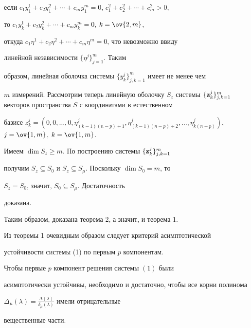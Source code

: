 если $c_1y^1_1+c_2y^2_1+\dotsb+c_m y^m_1=0$, $c^2_1+c^2_2+\dotsb+ c^2_m>0$, 


то $c_1y^1_k+c_2y^2_k+\dotsb+c_m y^m_k=0$, $k=\ov{2,m}$, 


откуда $c_1\eta^1+c_2\eta^2+\dotsb+c_m\eta^m=0$, что невозможно ввиду 


линейной независимости $\{\eta^j\}^m_{j=1}$. Таким 


образом, линейная оболочка системы $\{y^j_k\}^m_{j,k=1}$ имеет не менее чем 


$m$ измерений. Рассмотрим теперь линейную оболочку $S_z$ системы $\{\bold 


z^j_k\}^m_{j,k=1}$ векторов пространства $S$ с координатами в естественном 


базисе $z^j_k=(0,0,\dotsc,0, \eta^j_{(k-1)(n-p)+1}, 


\eta^j_{(k-1)(n-p)+2},\dotsc, \eta^j_{k(n-p)})$, $j=\ov{1,m}$, $k=\ov{1,m}$. 


Имеем $\dim S_z\ge m$. По построению системы $\{\bold z^j_k\}^m_{j,k=1}$ 


получим $S_z\subseteq S_0$ и $S_z\subseteq S_\mu$. Поскольку $\dim S_0=m$, то 


$S_z=S_0$, значит, $S_0\subseteq S_\mu$. Достаточность 


доказана.


 


Таким образом, доказана теорема 2, а значит, и теорема 1. 


\medskip 


 


Из теоремы 1 очевидным образом следует критерий асимптотической 


устойчивости системы (1) по первым $p$ компонентам. 


 


\begin{thm} 


Чтобы первые $p$ компонент решения системы $(1)$ были 


асимптотически устойчивы, необходимо и достаточно, чтобы все корни полинома 


$\Delta_\mu(\lambda)=\frac{\Delta(\lambda)}{\delta_\mu(\lambda)}$ имели отрицательные 


вещественные части. 


\end{thm} 


